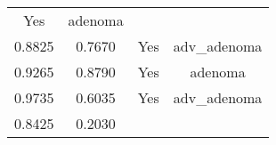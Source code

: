\documentclass[12pt,]{article}
\begin{document}
\begin{longtable}[]{@{}cccc@{}}
\begin{minipage}[t]{0.22\columnwidth}
Yes\strut
\end{minipage} & \begin{minipage}[t]{0.16\columnwidth}\centering\strut
adenoma\strut
\end{minipage}\tabularnewline
\begin{minipage}[t]{0.24\columnwidth}\centering\strut
0.8825\strut
\end{minipage} & \begin{minipage}[t]{0.26\columnwidth}\centering\strut
0.7670\strut
\end{minipage} & \begin{minipage}[t]{0.22\columnwidth}\centering\strut
Yes\strut
\end{minipage} & \begin{minipage}[t]{0.16\columnwidth}\centering\strut
adv\_adenoma\strut
\end{minipage}\tabularnewline
\begin{minipage}[t]{0.24\columnwidth}\centering\strut
0.9265\strut
\end{minipage} & \begin{minipage}[t]{0.26\columnwidth}\centering\strut
0.8790\strut
\end{minipage} & \begin{minipage}[t]{0.22\columnwidth}\centering\strut
Yes\strut
\end{minipage} & \begin{minipage}[t]{0.16\columnwidth}\centering\strut
adenoma\strut
\end{minipage}\tabularnewline
\begin{minipage}[t]{0.24\columnwidth}\centering\strut
0.9735\strut
\end{minipage} & \begin{minipage}[t]{0.26\columnwidth}\centering\strut
0.6035\strut
\end{minipage} & \begin{minipage}[t]{0.22\columnwidth}\centering\strut
Yes\strut
\end{minipage} & \begin{minipage}[t]{0.16\columnwidth}\centering\strut
adv\_adenoma\strut
\end{minipage}\tabularnewline
\begin{minipage}[t]{0.24\columnwidth}\centering\strut
0.8425\strut
\end{minipage} & \begin{minipage}[t]{0.26\columnwidth}\centering\strut
0.2030\strut
\end{minipage} & \begin{minipage}[t]{0.22\columnwidth}\centering\strut

\end{minipage}
\end{longtable}
\end{document}
